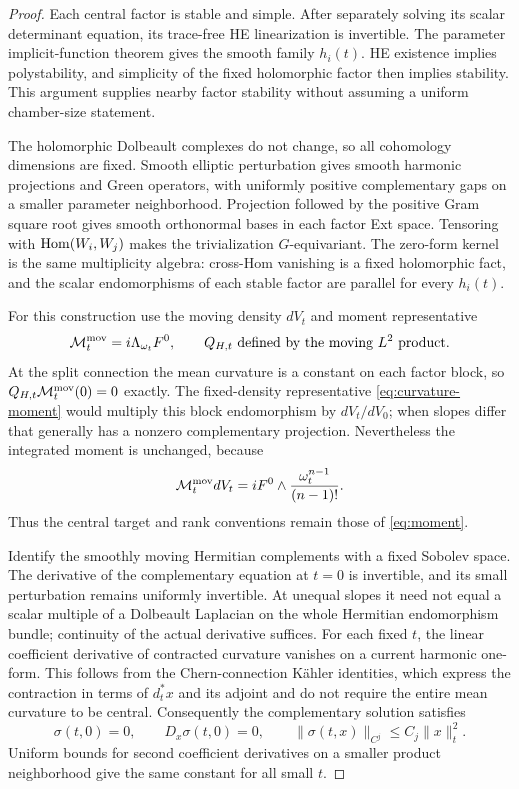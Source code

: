 \begin{proof}
Each central factor is stable and simple. After separately solving
its scalar determinant equation, its trace-free HE linearization
is invertible. The parameter implicit-function theorem gives the
smooth family $h_i(t)$. HE existence implies polystability, and
simplicity of the fixed holomorphic factor then implies stability.
This argument supplies nearby factor stability without assuming a
uniform chamber-size statement.

The holomorphic Dolbeault complexes do not change, so all cohomology
dimensions are fixed. Smooth elliptic perturbation gives smooth
harmonic projections and Green operators, with uniformly positive
complementary gaps on a smaller parameter neighborhood.
Projection followed by the positive Gram square root gives smooth
orthonormal bases in each factor Ext space. Tensoring with
$\operatorname{Hom}(W_i,W_j)$ makes the trivialization $G$-equivariant.
The zero-form kernel is the same multiplicity algebra: cross-Hom
vanishing is a fixed holomorphic fact, and the scalar endomorphisms
of each stable factor are parallel for every $h_i(t)$.

For this construction use the moving density $dV_t$ and moment
representative
\begin{equation}\label{eq:moving-moment}
 \mathcal M_t^{\mathrm{mov}}=i\Lambda_{\omega_t}F^0,
 \qquad Q_{H,t}\text{ defined by the moving }L^2\text{ product}.
\end{equation}
At the split connection the mean curvature is a constant on each
factor block, so
$Q_{H,t}\mathcal M_t^{\mathrm{mov}}(0)=0$ exactly.
The fixed-density representative \eqref{eq:curvature-moment}
would multiply this block endomorphism by $dV_t/dV_0$; when slopes
differ that generally has a nonzero complementary projection.
Nevertheless the integrated moment is unchanged, because
\[
 \mathcal M_t^{\mathrm{mov}}dV_t
       =iF^0\wedge\frac{\omega_t^{n-1}}{(n-1)!}.
\]
Thus the central target and rank conventions remain those of
\eqref{eq:moment}.

Identify the smoothly moving Hermitian complements with a fixed
Sobolev space. The derivative of the complementary equation at
$t=0$ is invertible, and its small perturbation remains uniformly
invertible. At unequal slopes it need not equal a scalar multiple
of a Dolbeault Laplacian on the whole Hermitian endomorphism bundle;
continuity of the actual derivative suffices.
For each fixed $t$, the linear coefficient derivative of contracted
curvature vanishes on a current harmonic one-form. This follows
from the Chern-connection K\"ahler identities, which express the
contraction in terms of $d_t^*x$ and its adjoint and do not require
the entire mean curvature to be central.
Consequently the complementary solution satisfies
\begin{equation}\label{eq:moving-sigma}
 \sigma(t,0)=0,\qquad D_x\sigma(t,0)=0,\qquad
 \|\sigma(t,x)\|_{C^j}\le C_j\|x\|_t^2 .
\end{equation}
Uniform bounds for second coefficient derivatives on a smaller
product neighborhood give the same constant for all small $t$.


\end{proof}
